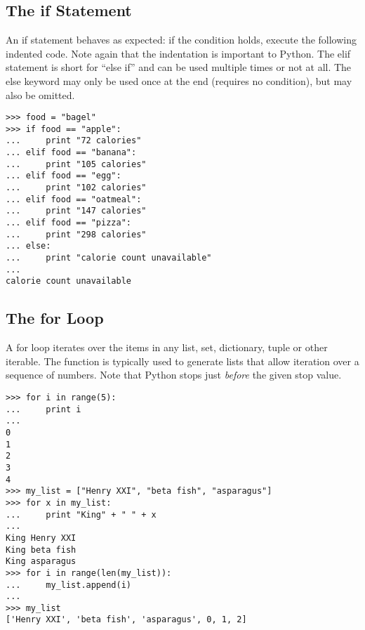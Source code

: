\subsection*{The if Statement}
\begin{example}
An if statement behaves as expected: if the condition holds, execute the 
following indented code. Note again that the indentation is important to Python. 
The elif statement is short for ``else if'' and can be used multiple times or not at all. 
The else keyword may only be used once at the end (requires no condition), 
but may also be omitted. 
\begin{lstlisting}
>>> food = "bagel"
>>> if food == "apple":
...     print "72 calories"
... elif food == "banana":
...     print "105 calories"
... elif food == "egg":
...     print "102 calories"
... elif food == "oatmeal":
...     print "147 calories"
... elif food == "pizza":
...     print "298 calories"
... else: 
...     print "calorie count unavailable"
...     
calorie count unavailable
\end{lstlisting}
\end{example}

\subsection*{The for Loop}
\begin{example}
A for loop iterates over the items in any list, set, dictionary, tuple or other iterable. 
The  function is typically used to generate lists that allow iteration 
over a sequence of numbers. Note that Python stops just \emph{before} the given stop value. 

\begin{lstlisting}
>>> for i in range(5):
...     print i
...     
0
1
2
3
4
>>> my_list = ["Henry XXI", "beta fish", "asparagus"]
>>> for x in my_list:
...     print "King" + " " + x
...     
King Henry XXI
King beta fish
King asparagus
>>> for i in range(len(my_list)):
...     my_list.append(i)
...     
>>> my_list
['Henry XXI', 'beta fish', 'asparagus', 0, 1, 2]
\end{lstlisting}
\end{example}


